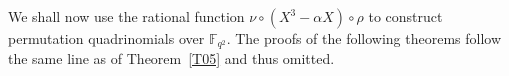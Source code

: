 \documentclass[12pt]{amsart}
\numberwithin{equation}{section}
\theoremstyle{definition}
\newcommand{\F}{\mathbb F}
\begin{document}
We shall now use the rational function ${\nu} \circ (X^3-\alpha X) \circ \rho$ to construct permutation quadrinomials over $\F_{q^2}$. 
The proofs of the following theorems follow the same line as of Theorem~\ref{T05} and thus omitted.
\end{document}
